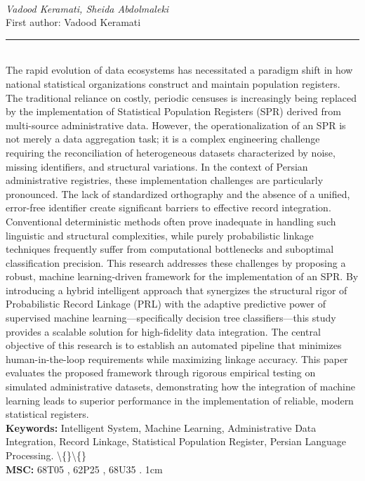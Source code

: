\documentclass[10pt,twoside]{article}
\begin{document}
\noindent\begin{minipage}[t][\textheight]{\textwidth}
\\[0.35em]
{\itshape Vadood Keramati, Sheida Abdolmaleki}\\[0.2em]
{\footnotesize First author: Vadood Keramati}\\[0.45em]
\noindent\rule{\textwidth}{0.3pt}\\[0.4em]
{\footnotesize  The rapid evolution of data ecosystems has necessitated a paradigm shift in how national statistical organizations construct and maintain population registers. The traditional reliance on costly, periodic censuses is increasingly being replaced by the implementation of Statistical Population Registers (SPR) derived from multi-source administrative data. However, the operationalization of an SPR is not merely a data aggregation task; it is a complex engineering challenge requiring the reconciliation of heterogeneous datasets characterized by noise, missing identifiers, and structural variations. In the context of Persian administrative registries, these implementation challenges are particularly pronounced. The lack of standardized orthography and the absence of a unified, error-free identifier create significant barriers to effective record integration. Conventional deterministic methods often prove inadequate in handling such linguistic and structural complexities, while purely probabilistic linkage techniques frequently suffer from computational bottlenecks and suboptimal classification precision. This research addresses these challenges by proposing a robust, machine learning-driven framework for the implementation of an SPR. By introducing a hybrid intelligent approach that synergizes the structural rigor of Probabilistic Record Linkage (PRL) with the adaptive predictive power of supervised machine learning---specifically decision tree classifiers---this study provides a scalable solution for high-fidelity data integration. The central objective of this research is to establish an automated pipeline that minimizes human-in-the-loop requirements while maximizing linkage accuracy. This paper evaluates the proposed framework through rigorous empirical testing on simulated administrative datasets, demonstrating how the integration of machine learning leads to superior performance in the implementation of reliable, modern statistical registers.}\\[0.4em]
{\footnotesize\bfseries Keywords:} {\footnotesize Intelligent System, Machine Learning, Administrative Data Integration, Record Linkage, Statistical Population Register, Persian Language Processing. \textbackslash\{\}\textbackslash\{\}}\\[0.15em]
{\footnotesize\bfseries MSC:} {\footnotesize 68T05 , 62P25 , 68U35 . 1cm}\\
\vfill
\end{minipage}
\newpage
\end{document}
